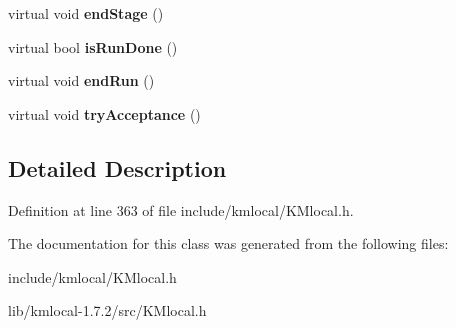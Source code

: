 \begin{DoxyCompactItemize}
\item 
\hypertarget{class_k_mlocal_swap_a70a8d8d298e57c324d2e45a62c8f424c}{
virtual void {\bfseries endStage} ()}
\label{class_k_mlocal_swap_a70a8d8d298e57c324d2e45a62c8f424c}

\item 
\hypertarget{class_k_mlocal_swap_ab57913c5e708502800a71d6f78920cd3}{
virtual bool {\bfseries isRunDone} ()}
\label{class_k_mlocal_swap_ab57913c5e708502800a71d6f78920cd3}

\item 
\hypertarget{class_k_mlocal_swap_a988c84df66bc099c378a002205b9e007}{
virtual void {\bfseries endRun} ()}
\label{class_k_mlocal_swap_a988c84df66bc099c378a002205b9e007}

\item 
\hypertarget{class_k_mlocal_swap_af3b761e9e91d984a3506fbe38cf1646a}{
virtual void {\bfseries tryAcceptance} ()}
\label{class_k_mlocal_swap_af3b761e9e91d984a3506fbe38cf1646a}

\end{DoxyCompactItemize}


\subsection{Detailed Description}


Definition at line 363 of file include/kmlocal/KMlocal.h.



The documentation for this class was generated from the following files:\begin{DoxyCompactItemize}
\item 
include/kmlocal/KMlocal.h\item 
lib/kmlocal-\/1.7.2/src/KMlocal.h\end{DoxyCompactItemize}
